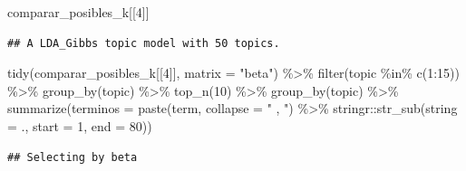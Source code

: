\documentclass[
]{book}
\newenvironment{Shaded}{\begin{snugshade}}{\end{snugshade}}
\newcommand{\AttributeTok}[1]{\textcolor[rgb]{0.77,0.63,0.00}{#1}}
\newcommand{\DecValTok}[1]{\textcolor[rgb]{0.00,0.00,0.81}{#1}}
\newcommand{\FunctionTok}[1]{\textcolor[rgb]{0.00,0.00,0.00}{#1}}
\newcommand{\NormalTok}[1]{#1}
\newcommand{\SpecialCharTok}[1]{\textcolor[rgb]{0.00,0.00,0.00}{#1}}
\newcommand{\StringTok}[1]{\textcolor[rgb]{0.31,0.60,0.02}{#1}}
\begin{document}
\begin{Shaded}
\begin{Highlighting}[]
\NormalTok{comparar\_posibles\_k[[}\DecValTok{4}\NormalTok{]]}
\end{Highlighting}
\end{Shaded}

\begin{verbatim}
## A LDA_Gibbs topic model with 50 topics.
\end{verbatim}

\begin{Shaded}
\begin{Highlighting}[]
\FunctionTok{tidy}\NormalTok{(comparar\_posibles\_k[[}\DecValTok{4}\NormalTok{]], }\AttributeTok{matrix =} \StringTok{"beta"}\NormalTok{) }\SpecialCharTok{\%\textgreater{}\%}
  \FunctionTok{filter}\NormalTok{(topic }\SpecialCharTok{\%in\%} \FunctionTok{c}\NormalTok{(}\DecValTok{1}\SpecialCharTok{:}\DecValTok{15}\NormalTok{)) }\SpecialCharTok{\%\textgreater{}\%}
  \FunctionTok{group\_by}\NormalTok{(topic) }\SpecialCharTok{\%\textgreater{}\%}
  \FunctionTok{top\_n}\NormalTok{(}\DecValTok{10}\NormalTok{) }\SpecialCharTok{\%\textgreater{}\%}
  \FunctionTok{group\_by}\NormalTok{(topic) }\SpecialCharTok{\%\textgreater{}\%}
  \FunctionTok{summarize}\NormalTok{(}\AttributeTok{terminos =} \FunctionTok{paste}\NormalTok{(term, }\AttributeTok{collapse =} \StringTok{" , "}\NormalTok{) }\SpecialCharTok{\%\textgreater{}\%}\NormalTok{ stringr}\SpecialCharTok{::}\FunctionTok{str\_sub}\NormalTok{(}\AttributeTok{string =}\NormalTok{ ., }\AttributeTok{start =} \DecValTok{1}\NormalTok{, }\AttributeTok{end =} \DecValTok{80}\NormalTok{))}
\end{Highlighting}
\end{Shaded}

\begin{verbatim}
## Selecting by beta
\end{verbatim}
\end{document}
